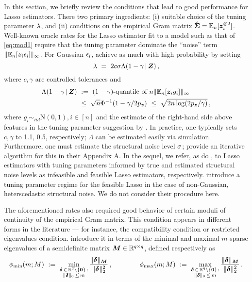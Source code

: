 \documentclass{uwstat572}
\newcommand{\be}{\begin{equation}}
\newcommand{\ee}{\end{equation}}
\newcommand{\benn}{\begin{equation*}}
\newcommand{\eenn}{\end{equation*}}
\theoremstyle{definition}
\theoremstyle{remark}
\newcommand{\R}{\ensuremath{\mathbb{R}}}
\newcommand{\Ex}{\mathbb{E}}
\newcommand{\Exn}{\Ex_n}
\newcommand{\Normal}{\mathrm{N}}
\newcommand{\bs}[1]{\boldsymbol{#1}}
\numberwithin{equation}{section}
\begin{document}
In this section, we briefly review the conditions that lead to good performance for Lasso estimators. There two primary ingredients: (i) suitable choice of the tuning parameter $\lambda$, and (ii) conditions on the empirical Gram matrix $\gramhat = \Exn[\z_i^{\kpt}]$. Well-known oracle rates for the Lasso estimator fit to a model such as that of \eqref{eq:mod1} require that the tuning parameter dominate the ``noise'' term $\|\Exn[\z_i\ersi]\|_\infty$. For Gaussian $\epsilon_i$, \cite{BC13} achieve as much with high probability by setting
\be\label{tune1}
	\tune \ = \ 2 c \sd \Lambda(1-\gamma\,|\,\Z)\,,
\ee
where $c, \gamma$ are controlled tolerances and 
\begin{align*}
	\Lambda(1 - \gamma\,|\,\Z) \ & := \ (1-\gamma)\text{-quantile of } n\|\Exn[\z_ig_i]\|_\infty\\
	& \leq \ \sqrt{n}\Phi^{-1}(1-\gamma/2\pz) \ \leq \ \sqrt{2n\log(2\pz/\gamma)} \,,
\end{align*}
where $g_i \sim_{iid} \Normal(0,1), i\in[n]$ and the estimate of the right-hand side above features in the tuning parameter suggestion by \cite{BRT09}. In practice, one typically sets $c,\gamma$ to 1.1, 0.5, respectively; $\Lambda$ can be estimated easily via simulation. Furthermore, one must estimate the structural noise level $\sigma$; \cite{BCH11} provide an iterative algorithm for this in their Appendix A. In the sequel, we refer, as do \cite{BCH11}, to Lasso estimators with tuning parameters informed by true and estimated structural noise levels as infeasible and feasible Lasso estimators, respectively. \cite{BCCH12} introduce a tuning parameter regime for the feasible Lasso in the case of non-Gaussian, heterscedastic structural noise. We do not consider their procedure here. 

The aforementioned rates also required good behavior of certain moduli of continuity of the empirical Gram matrix. This condition appears in different forms in the literature --- for instance, the compatibility condition or restricted eigenvalues condition. \cite{BCH11} introduce it in terms of the minimal and maximal $m$-sparse eigenvalues of a semidefinite matrix $\M \in \R^{q \times q}$, defined respectively as
\benn
	\minse(m; M) \ := \ \min_{\substack{\diff\,\in\,\R^q\setminus\{\bs{0}\} \,: \\ \|\diff\|_0 \,\leq\, m}} \frac{\|\diff\|_{\M}}{\|\diff\|_2^2}\,, \qquad\qquad
	\maxse(m; M) \ := \ \max_{\substack{\diff\,\in\,\R^q\setminus\{\bs{0}\} \,: \\ \|\diff\|_0 \,\leq\, m}} \frac{\|\diff\|_{\M}}{\|\diff\|_2^2}\,.
\eenn
\end{document}
